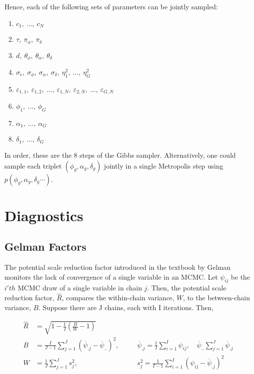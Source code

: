 \documentclass{article}\usepackage{graphicx, color}
\newenvironment{knitrout}{}{} %
\providecommand{\e}{\varepsilon}
\providecommand{\ov}[1]{\overline{#1}}
\providecommand{\wh}[1]{\widehat{#1}}
\begin{document}
\begin{flushleft}
\begin{knitrout}
\end{knitrout}


Hence, each of the following sets of parameters can be jointly sampled:

\begin{enumerate}
\item $c_1, \ \ldots, \ c_N$
\item $\tau, \ \pi_\alpha, \ \pi_\delta$
\item $d, \ \theta_\phi, \ \theta_\alpha, \ \theta_\delta$
\item $\sigma_c, \ \sigma_\phi, \ \sigma_\alpha, \ \sigma_\delta, \ \eta_1^2, \ \ldots, \ \eta_G^2$
\item $\e_{1, 1}, \ \e_{1, 2}, \ \ldots, \ \e_{1, N}, \ \e_{2, N}, \ \ldots, \ \e_{G, N}$
\item $\phi_1, \ \ldots, \ \phi_G$
\item $\alpha_1, \ \ldots, \ \alpha_G$
\item $\delta_1, \ \ldots, \ \delta_G$
\end{enumerate}

In order, these are the 8 steps of the Gibbs sampler. Alternatively, one could sample each triplet $(\phi_g, \alpha_g, \delta_g)$ jointly in a single Metropolis step using $p(\phi_g, \alpha_g, \delta_g \cdots)$.


\section{Diagnostics}


\subsection{Gelman Factors}

The potential scale reduction factor introduced in the textbook by Gelman \cite{gelman} monitors the lack of convergence of a single variable in an MCMC. Let $\psi_{ij}$ be the $i'th$ MCMC draw of a single variable in chain $j$. Then, the potential scale reduction factor, $\wh{R}$, compares the within-chain variance, $W$, to the between-chain variance, $B$. Suppose there are J chains, each with I iterations. Then, 

\begin{align*}
\wh{R} &= \sqrt{1 - \frac{1}{I} \left (\frac{B}{W} - 1 \right )} \\
B &= \frac{I}{J-1} \sum_{j = 1}^J (\ov{\psi}_{.j} - \ov{\psi}_{..})^2, \quad &&\ov{\psi}_{.j} = \frac{1}{I} \sum_{i = 1}^I \psi_{ij}, \quad \ov{\psi}_{..} \sum_{j = 1}^J \ov{\psi}_{.j} \\
W &= \frac{1}{J} \sum_{j = 1}^J s^2_j, && s_j^2 = \frac{1}{I - 1} \sum_{i = 1}^I (\psi_{ij} - \ov{\psi}_{.j})^2\\
\end{align*}


\end{flushleft}
\end{document}
